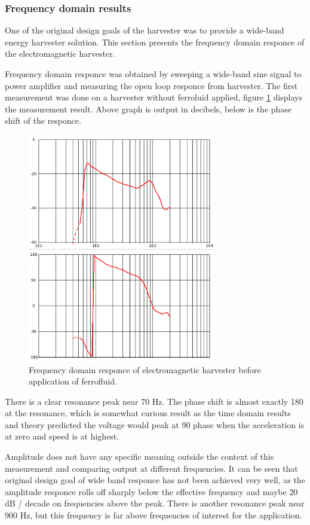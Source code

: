 \subsubsection{Frequency domain results}
One of the original design goals of the harvester was to provide a wide-band energy harvester solution. This section presents the frequency domain responce of the electromagnetic harvester.

Frequency domain responce was obtained by sweeping a wide-band sine signal to power amplifier and measuring the open loop responce from harvester. The first measurement was done on a harvester without ferroluid applied, figure \ref{fig:inductive_fd_dry} displays the measurement result. Above graph is output in decibels, below is the phase shift of the responce.

\begin{figure}[htb]
\begin{center}
\includegraphics[height=10cm]{images/own_measurement/generator_shaker/inductive_fd_dry.png}
\end{center}
\caption{\label{fig:inductive_fd_dry} Frequency domain responce of electromagnetic harvester before application of ferrofluid.}
\end{figure}

There is a clear resonance peak near 70 Hz. The phase shift is almost exactly 180 \degree at the resonance, which is somewhat curious result as the time domain results and theory predicted the voltage would peak at 90 \degree phase when the acceleration is at zero and speed is at highest. 

Amplitude does not have any specific meaning outside the context of this measurement and comparing output at different frequencies. It can be seen that original design goal of wide band responce has not been achieved very well, as the amplitude responce rolls off sharply below the effective frequency and maybe 20 dB / decade on frequencies above the peak. There is another resonance peak near 900 Hz, but this frequency is far above frequencies of interest for the application. 

